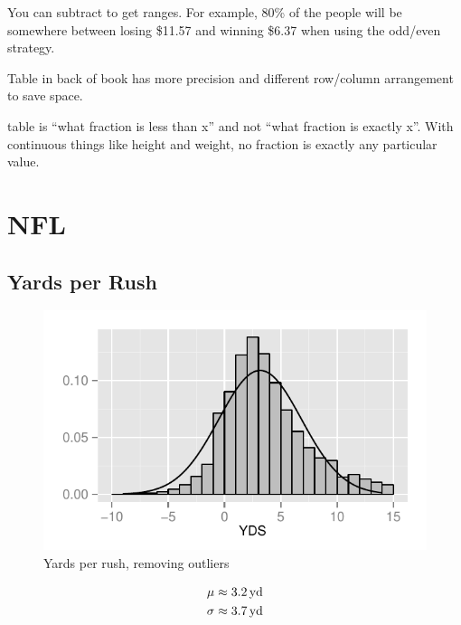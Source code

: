 \documentclass[landscape]{exam}
\begin{document}
  You can subtract to get ranges. For example, 80\% of the people will be
  somewhere between losing \$11.57 and winning \$6.37 when using the odd/even
  strategy.

  \begin{itemize*}
    \item Table in back of book has more precision and different row/column
      arrangement to save space.
    \item table is ``what fraction is less than x'' and not ``what fraction is
      exactly x''.  With continuous things like height and weight, no fraction is
      exactly any particular value.
  \end{itemize*}


  \section{NFL}

  \subsection{Yards per Rush} %
  
  \begin{figure}[H]
    \centering
    \includegraphics[scale = 0.9]{figures/nfl/yards_per_rush.pdf}
    \caption{Yards per rush, removing outliers}
  \end{figure}

  \begin{align*}
    \mu    & \approx \unit[3.2]{yd} \\
    \sigma & \approx \unit[3.7]{yd} \\
  \end{align*}
\end{document}
